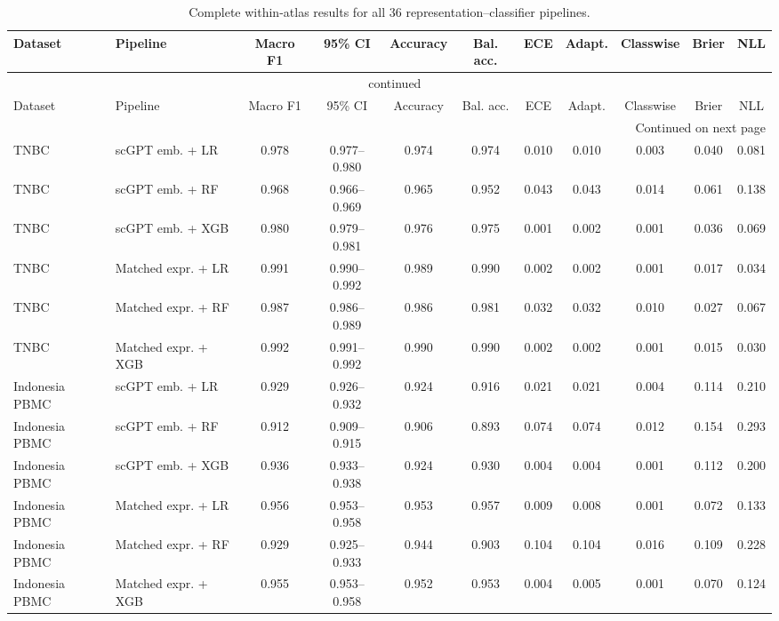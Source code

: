 \begin{landscape}
\scriptsize
\setlength{\tabcolsep}{2.6pt}
\begin{longtable}{llccccccccc}
\caption{Complete within-atlas results for all 36 representation--classifier pipelines.}\label{tab:s1}\\
\toprule Dataset & Pipeline & Macro F1 & 95\% CI & Accuracy & Bal. acc. & ECE & Adapt. & Classwise & Brier & NLL \\
\midrule\endfirsthead
\multicolumn{11}{c}{\tablename\ \thetable{} continued}\\\toprule
Dataset & Pipeline & Macro F1 & 95\% CI & Accuracy & Bal. acc. & ECE & Adapt. & Classwise & Brier & NLL \\
\midrule\endhead
\midrule\multicolumn{11}{r}{Continued on next page}\\\endfoot
\bottomrule\endlastfoot
TNBC & scGPT emb. + LR & 0.978 & 0.977--0.980 & 0.974 & 0.974 & 0.010 & 0.010 & 0.003 & 0.040 & 0.081 \\
TNBC & scGPT emb. + RF & 0.968 & 0.966--0.969 & 0.965 & 0.952 & 0.043 & 0.043 & 0.014 & 0.061 & 0.138 \\
TNBC & scGPT emb. + XGB & 0.980 & 0.979--0.981 & 0.976 & 0.975 & 0.001 & 0.002 & 0.001 & 0.036 & 0.069 \\
TNBC & Matched expr. + LR & 0.991 & 0.990--0.992 & 0.989 & 0.990 & 0.002 & 0.002 & 0.001 & 0.017 & 0.034 \\
TNBC & Matched expr. + RF & 0.987 & 0.986--0.989 & 0.986 & 0.981 & 0.032 & 0.032 & 0.010 & 0.027 & 0.067 \\
TNBC & Matched expr. + XGB & 0.992 & 0.991--0.992 & 0.990 & 0.990 & 0.002 & 0.002 & 0.001 & 0.015 & 0.030 \\
\addlinespace
Indonesia PBMC & scGPT emb. + LR & 0.929 & 0.926--0.932 & 0.924 & 0.916 & 0.021 & 0.021 & 0.004 & 0.114 & 0.210 \\
Indonesia PBMC & scGPT emb. + RF & 0.912 & 0.909--0.915 & 0.906 & 0.893 & 0.074 & 0.074 & 0.012 & 0.154 & 0.293 \\
Indonesia PBMC & scGPT emb. + XGB & 0.936 & 0.933--0.938 & 0.924 & 0.930 & 0.004 & 0.004 & 0.001 & 0.112 & 0.200 \\
Indonesia PBMC & Matched expr. + LR & 0.956 & 0.953--0.958 & 0.953 & 0.957 & 0.009 & 0.008 & 0.001 & 0.072 & 0.133 \\
Indonesia PBMC & Matched expr. + RF & 0.929 & 0.925--0.933 & 0.944 & 0.903 & 0.104 & 0.104 & 0.016 & 0.109 & 0.228 \\
Indonesia PBMC & Matched expr. + XGB & 0.955 & 0.953--0.958 & 0.952 & 0.953 & 0.004 & 0.005 & 0.001 & 0.070 & 0.124 \\

\end{longtable}
\end{landscape}
